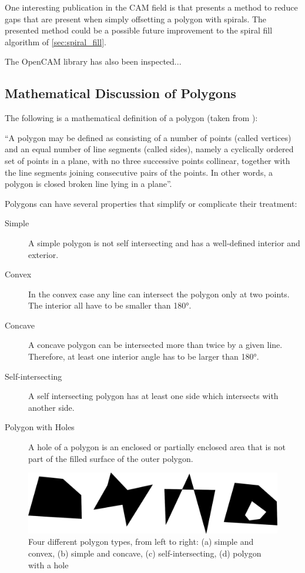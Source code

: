 One interesting publication in the CAM field is \cite{kao1998optimal} that presents a method to reduce gaps that are present when simply offsetting a polygon with spirals. The presented method could be a possible future improvement to the spiral fill algorithm of \autoref{sec:spiral_fill}.

The OpenCAM library has also been inspected...

\subsection{Mathematical Discussion of Polygons}

The following is a mathematical definition of a polygon (taken from \cite{coxeter1967geometry}):

\enquote{A polygon may be defined as consisting of a number of points (called vertices) and an equal number of line segments (called sides), namely a cyclically ordered set of points in a plane, with no three successive points collinear, together with the line segments joining consecutive pairs of the points. In other words, a polygon is closed broken line lying in a plane}.

Polygons can have several properties that simplify or complicate their treatment:

\begin{description}
\item[Simple] A simple polygon is not self intersecting and has a well-defined interior and exterior.\cite{weisstein_simple_p}
\item[Convex] In the convex case any line can intersect the polygon only at two points. The interior all have to be smaller than 180°.\cite{weisstein_convex_p}
\item[Concave] A concave polygon can be intersected more than twice by a given line. Therefore, at least one interior angle has to be larger than 180°.\cite{weisstein_concave_p}
\item[Self-intersecting] A self intersecting polygon has at least one side which intersects with another side.
\item[Polygon with Holes] A hole of a polygon is an enclosed or partially enclosed area that is not part of the filled surface of the outer polygon.
\end{description}

\begin{figure}
\centering
\includegraphics[width=\textwidth]{images/path_planning/polygon_types.pdf}
\caption{Four different polygon types, from left to right: (a) simple and convex, (b) simple and concave, (c) self-intersecting, (d) polygon with a hole}
\label{straight_skel}
\end{figure}

